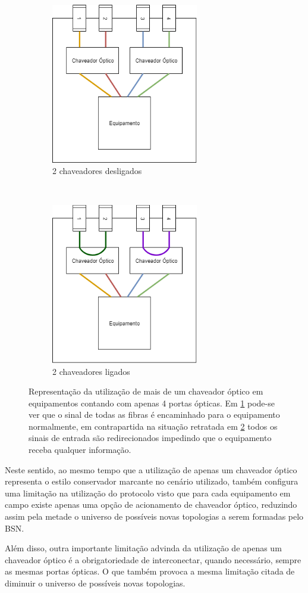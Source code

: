 \begin{figure}[t!]
	\centering
	\begin{subfigure}[t]{0.4\textwidth}
		\centering
		\includegraphics[height=7cm]{./figuras/2-opt-sw-off.png} %
		\caption{2 chaveadores desligados}
		\label{fig_2optsw_off}
	\end{subfigure}%
	~
	\begin{subfigure}[t]{0.4\textwidth}
		\centering
		\includegraphics[height=7cm]{./figuras/2-opt-sw-on.png} %
	\caption{2 chaveadores ligados}
	\label{fig_2optsw_on}
	\end{subfigure}
	\caption[Multiplicidade de chaveadores ópticos]{Representação da utilização de mais de um chaveador óptico em equipamentos contando com apenas 4 portas ópticas. Em \ref{fig_2optsw_off} pode-se ver que o sinal de todas as fibras é encaminhado para o equipamento normalmente, em contrapartida na situação retratada em \ref{fig_2optsw_on} todos os sinais de entrada são redirecionados impedindo que o equipamento receba qualquer informação.}
	\label{fig_2optsw}
\end{figure}

Neste sentido, ao mesmo tempo que a utilização de apenas um chaveador óptico representa o estilo conservador marcante no cenário utilizado, também configura uma limitação na utilização do protocolo visto que para cada equipamento em campo existe apenas uma opção de acionamento de chaveador óptico, reduzindo assim pela metade o universo de possíveis novas topologias a serem formadas pelo BSN.

Além disso, outra importante limitação advinda da utilização de apenas um chaveador óptico é a obrigatoriedade de interconectar, quando necessário, sempre as mesmas portas ópticas. O que também provoca a mesma limitação citada de diminuir o universo de possíveis novas topologias.